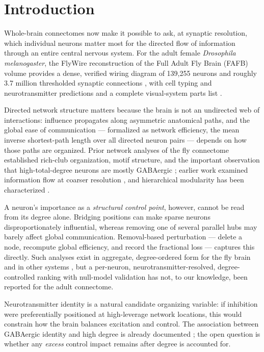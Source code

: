 \section{Introduction}

Whole-brain connectomes now make it possible to ask, at synaptic
resolution, which individual neurons matter most for the directed flow of
information through an entire central nervous system. For the adult female
\emph{Drosophila melanogaster}, the FlyWire reconstruction of the Full
Adult Fly Brain (FAFB) volume provides a dense, verified wiring diagram of
139,255 neurons and roughly 3.7 million thresholded synaptic connections
\cite{dorkenwald2024}, with cell typing and neurotransmitter predictions
\cite{schlegel2024} and a complete visual-system parts list
\cite{matsliah2024}.

Directed network structure matters because the brain is not an undirected
web of interactions: influence propagates along asymmetric anatomical
paths, and the global ease of communication --- formalized as network
efficiency, the mean inverse shortest-path length over all directed neuron
pairs --- depends on how those paths are organized. Prior network analyses
of the fly connectome established rich-club organization, motif structure,
and the important observation that high-total-degree neurons are mostly
GABAergic \cite{lin2024}; earlier work examined information flow at coarser
resolution \cite{shih2015}, and hierarchical modularity has been
characterized \cite{kunin2023}.

A neuron's importance as a \emph{structural control point}, however, cannot
be read from its degree alone. Bridging positions can make sparse neurons
disproportionately influential, whereas removing one of several parallel
hubs may barely affect global communication. Removal-based perturbation ---
delete a node, recompute global efficiency, and record the fractional loss
--- captures this directly. Such analyses exist in aggregate,
degree-ordered form for the fly brain \cite{lin2024} and in other systems
\cite{uzel2022}, but a per-neuron, neurotransmitter-resolved,
degree-controlled ranking with null-model validation has not, to our
knowledge, been reported for the adult connectome.

Neurotransmitter identity is a natural candidate organizing variable: if
inhibition were preferentially positioned at high-leverage network
locations, this would constrain how the brain balances excitation and
control. The association between GABAergic identity and high degree is
already documented \cite{lin2024}; the open question is whether any
\emph{excess} control impact remains after degree is accounted for.

